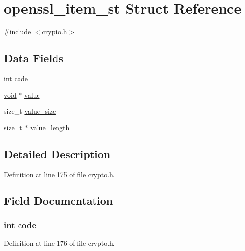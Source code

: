 \hypertarget{structopenssl__item__st}{}\section{openssl\+\_\+item\+\_\+st Struct Reference}
\label{structopenssl__item__st}


{\ttfamily \#include $<$crypto.\+h$>$}

\subsection*{Data Fields}
\begin{DoxyCompactItemize}
\item 
int \hyperlink{structopenssl__item__st_a45a5b7c00a796a23f01673cef1dbe0a9}{code}
\item 
\hyperlink{hw__4758__cca_8h_afad4d591c7931ff6dc5bf69c76c96aa0}{void} $\ast$ \hyperlink{structopenssl__item__st_a7dccac59eba23582a5101033863db989}{value}
\item 
size\+\_\+t \hyperlink{structopenssl__item__st_a1f79f22363173f16bbbb89bbc3f93783}{value\+\_\+size}
\item 
size\+\_\+t $\ast$ \hyperlink{structopenssl__item__st_aff68878384a4ae3d8369da3fd1e6452b}{value\+\_\+length}
\end{DoxyCompactItemize}


\subsection{Detailed Description}


Definition at line 175 of file crypto.\+h.



\subsection{Field Documentation}
\subsubsection[{\texorpdfstring{code}{code}}]{\setlength{\rightskip}{0pt plus 5cm}int code}\hypertarget{structopenssl__item__st_a45a5b7c00a796a23f01673cef1dbe0a9}{}\label{structopenssl__item__st_a45a5b7c00a796a23f01673cef1dbe0a9}


Definition at line 176 of file crypto.\+h.

